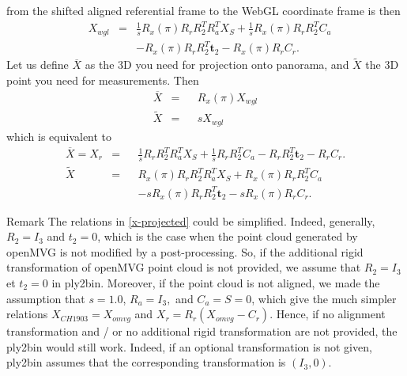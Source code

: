 \documentclass[a4paper, 11pt]{article}
\renewcommand{\tilde}{\widetilde}
\renewcommand{\t}{\mathbf{t}}
\begin{document}
   from the shifted aligned referential frame to the WebGL coordinate frame is then 
   \begin{equation}
       \begin{aligned}
           & X_{wgl} & = & \frac{1}{s} R_x(\pi) R_r R_2^T R_a^T X_S + \frac{1}{s} R_x(\pi) R_r R_2^T C_a \\
            &&&       -R_x(\pi) R_r R_2^T \t_2 - R_x(\pi) R_r C_r.
       \end{aligned}
   \end{equation}  
   Let us define $\overline X $ as the 3D you need for projection onto panorama, and $\tilde X$ the 3D point you need 
   for measurements. Then 
   \begin{equation}
        \begin{aligned}
        \overline X & = && R_x(\pi) X_{wgl} \\
        \tilde X & = && s X_{wgl}
        \end{aligned}
   \end{equation}
   which is equivalent to 
   \begin{equation}
      \label{x-projected}
        \begin{aligned}
        \overline X = X_r & = && \frac{1}{s} R_r R_2^T R_a^T X_S + \frac{1}{s} R_r R_2^T C_a -R_r R_2^T \t_2 - R_r C_r. \\
        \tilde X & = && R_x(\pi) R_r R_2^T R_a^T X_S + R_x(\pi) R_r R_2^T C_a \\
            &&&       -s R_x(\pi) R_r R_2^T \t_2 - s R_x(\pi) R_r C_r.
        \end{aligned}
   \end{equation}
   \begin{paragraph}{Remark}
      The relations in \eqref{x-projected} could be simplified. Indeed, generally, $R_2 = I_3$ and $t_2 = 0$, which is
      the case when the point cloud generated by openMVG is not modified by a post-processing. So, if the additional
      rigid transformation of openMVG point cloud is not provided, we assume that $R_2 = I_3$ et $t_2 = 0$ in ply2bin.
      Moreover, if the point cloud is not aligned, we made the assumption that $s=1.0$, $R_a = I_3,$ and $C_a = S = 0$, 
      which give the much simpler relations $X_{CH1903} = X_{omvg}$ and $X_r = R_r (X_{omvg}-C_r)$.
      Hence, if no alignment transformation and / or no additional rigid transformation are not provided, the ply2bin would
      still work. Indeed, if an optional transformation is not given, ply2bin assumes that the corresponding transformation
      is $(I_3, 0)$.
   \end{paragraph}
\end{document}
